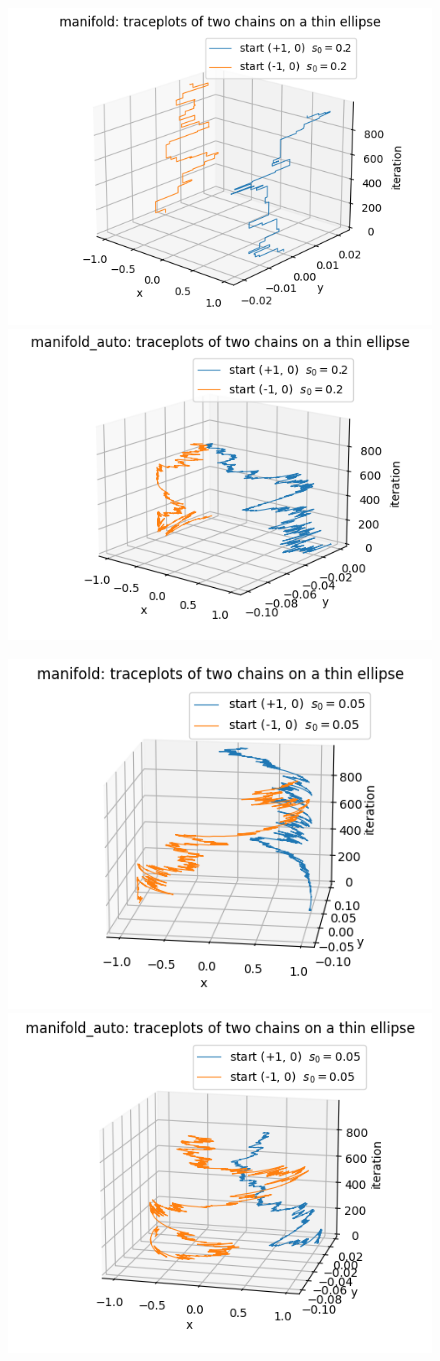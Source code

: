 \documentclass{article}
\begin{document}
\begin{figure}[H]
    \centering
    \begin{adjustbox}{width=\textwidth}%
      \begin{minipage}[t]{0.48\linewidth}
        \centering
        \includegraphics[width=.49\linewidth]{mixing_bad_s.png}\hfill
        \includegraphics[width=.49\linewidth]{mixing_auto_bad_s.png}
      \end{minipage}\hfill
      \begin{minipage}[t]{0.48\linewidth}
        \centering
        \includegraphics[width=.49\linewidth]{mixing_good_s.png}\hfill
        \includegraphics[width=.49\linewidth]{mixing_auto_good_s.png}
      \end{minipage}
    \end{adjustbox}


\end{figure}
\end{document}
